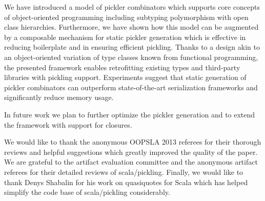 \documentclass[10pt]{sigplanconf}
\theoremstyle{definition}
\theoremstyle{definition}
\begin{document}
We have introduced a model of pickler combinators which supports core
concepts of object-oriented programming including subtyping polymorphism
with open class hierarchies. Furthermore, we have shown how this model
can be augmented by a composable mechanism for static pickler
generation which is effective in reducing boilerplate and in ensuring
efficient pickling. Thanks to a design akin to an object-oriented
variation of type classes known from functional programming, the
presented framework enables retrofitting existing types and
third-party libraries with pickling support. Experiments suggest that
static generation of pickler combinators can outperform
state-of-the-art serialization frameworks and significantly reduce
memory usage.

In future work we plan to further optimize the pickler generation and
to extend the framework with support for closures.





\acks

We would like to thank the anonymous OOPSLA 2013 referees for their thorough
reviews and helpful suggestions which greatly improved the quality of the
paper. We are grateful to the artifact evaluation committee and the anonymous
artifact referees for their detailed reviews of scala/pickling.
Finally, we would like to thank Denys Shabalin for his work on quasiquotes for
Scala which has helped simplify the code base of scala/pickling
considerably.








\begin{spacing}{0.9}


\end{spacing}
\end{document}
